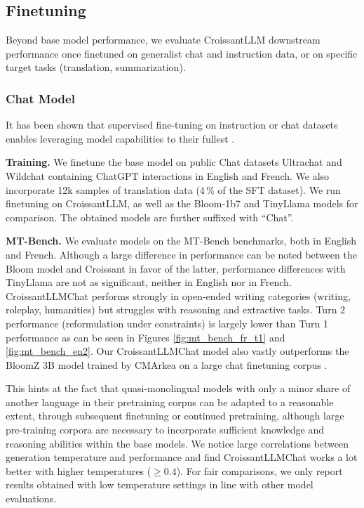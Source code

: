 \subsection{Finetuning}
Beyond base model performance, we evaluate CroissantLLM downstream performance once finetuned on generalist chat and instruction data, or on specific target tasks (translation, summarization).

\subsubsection{Chat Model}
It has been shown that supervised fine-tuning on instruction or chat datasets enables leveraging model capabilities to their fullest . 

\textbf{Training.}
We finetune the base model on public Chat datasets Ultrachat  and Wildchat  containing ChatGPT interactions in English and French. We also incorporate 12k samples of translation data (4\,\% of the SFT dataset). We run finetuning on CroissantLLM, as well as the Bloom-1b7 and TinyLlama models for comparison. The obtained models are further suffixed with ``Chat''.

\textbf{MT-Bench.}
We evaluate models on the MT-Bench benchmarks, both in English and French. Although a large difference in performance can be noted between the Bloom model and Croissant in favor of the latter, performance differences with TinyLlama are not as significant, neither in English nor in French. CroissantLLMChat performs strongly in open-ended writing categories (writing, roleplay, humanities) but struggles with reasoning and extractive tasks. Turn 2 performance (reformulation under constraints) is largely lower than Turn 1 performance as can be seen in Figures \ref{fig:mt_bench_fr_t1} and \ref{fig:mt_bench_en2}.  Our CroissantLLMChat model also vastly outperforms the BloomZ 3B model trained by CMArkea on a large chat finetuning corpus .


This hints at the fact that quasi-monolingual models with only a minor share of another language in their pretraining corpus can be adapted to a reasonable extent, through subsequent finetuning or continued pretraining, although large pre-training corpora are necessary to incorporate sufficient knowledge and reasoning abilities within the base models. We notice large correlations between generation temperature and performance and find CroissantLLMChat works a lot better with higher temperatures ($\geq 0.4$). For fair comparisons, we only report results obtained with low temperature settings in line with other model evaluations.


